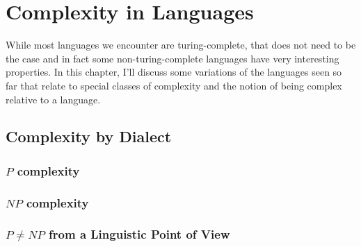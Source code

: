 \section{Complexity in Languages}
\label{sec:complexity}
While most languages we encounter are turing-complete, that does not 
need to be the case and in fact some non-turing-complete languages have very 
interesting properties. In this chapter, I'll discuss some variations of the 
languages seen so far that relate to special classes of complexity and the 
notion of being complex relative to a language.
\subsection{Complexity by Dialect} %
\label{sub:Complexity by Dialect}
\subsubsection{$P$ complexity} %
\label{ssub:P-complexity}

\subsubsection{$NP$ complexity} %
\label{ssub:NP-complexity}

\subsubsection{$P \neq NP$ from a Linguistic Point of View} %
\label{ssub:PNP from a Linguistic Point of View}


